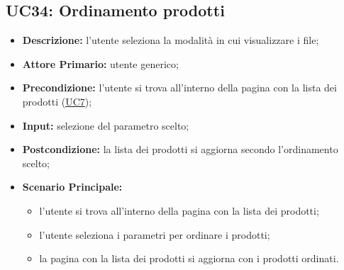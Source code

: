 \subsection{UC34: Ordinamento prodotti}
\label{sec:UC34}
\begin{itemize}
    \item \textbf{Descrizione:} l'utente seleziona la modalità in cui visualizzare i file;
    \item \textbf{Attore Primario:} utente generico;
    \item \textbf{Precondizione:} l'utente si trova all'interno della pagina con la lista dei prodotti (\hyperref[sec:UC7]{\underline{UC7}});
    \item \textbf{Input:} selezione del parametro scelto;
    \item \textbf{Postcondizione:} la lista dei prodotti si aggiorna secondo l'ordinamento scelto;
    \item \textbf{Scenario Principale:}
          \begin{itemize}
              \item l'utente si trova all'interno della pagina con la lista dei prodotti;
              \item l'utente seleziona i parametri per ordinare i prodotti;
              \item la pagina con la lista dei prodotti si aggiorna con i prodotti ordinati.
          \end{itemize}
\end{itemize}